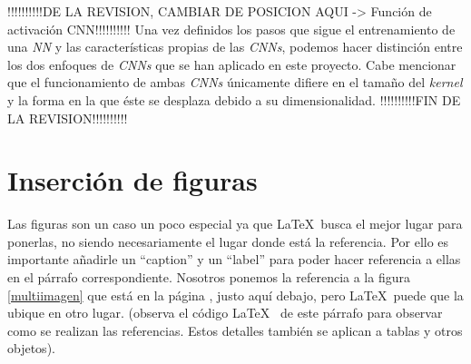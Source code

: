 \begin{enumerate}
\begin{enumerate}
            \end{enumerate}





            !!!!!!!!!!DE LA REVISION, CAMBIAR DE POSICION AQUI -> Función de activación CNN!!!!!!!!!!
            Una vez definidos los pasos que sigue el entrenamiento de una \textit{NN} y las características propias de las \textit{CNNs}, podemos hacer distinción entre los dos enfoques de \textit{CNNs} que se han aplicado en este proyecto. Cabe mencionar que el funcionamiento de ambas \textit{CNNs} únicamente difiere en el tamaño del \textit{kernel} y la forma en la que éste se desplaza debido a su dimensionalidad.
            !!!!!!!!!!FIN DE LA REVISION!!!!!!!!!!

            \cite{AutoSklearn}

    \end{enumerate}

\newpage



\section{Inserción de figuras}


Las figuras son un caso un poco especial ya que \LaTeX~busca el mejor lugar para ponerlas, no siendo necesariamente el lugar donde está la referencia. Por ello es importante añadirle un ``caption'' y un ``label'' para poder hacer referencia a ellas en el párrafo correspondiente. Nosotros ponemos la referencia a la figura \ref{multiimagen} que está en la página \pageref{multiimagen}, justo aquí debajo, pero \LaTeX ~puede que la ubique en otro lugar. (observa el código \LaTeX~ de este párrafo para observar como se realizan las referencias. Estos detalles también se aplican a tablas y otros objetos).



